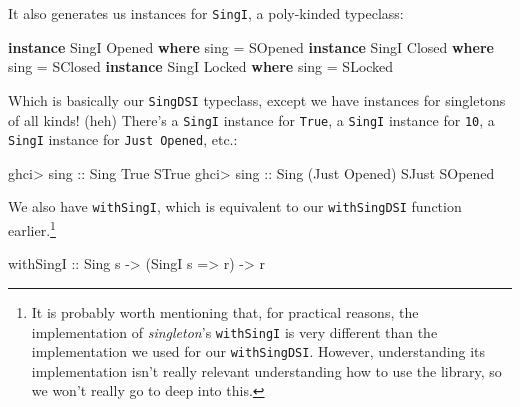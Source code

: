 \documentclass[]{article}
\newenvironment{Shaded}{}{}
\newcommand{\DataTypeTok}[1]{\textcolor[rgb]{0.56,0.13,0.00}{#1}}
\newcommand{\KeywordTok}[1]{\textcolor[rgb]{0.00,0.44,0.13}{\textbf{#1}}}
\newcommand{\NormalTok}[1]{#1}
\newcommand{\OperatorTok}[1]{\textcolor[rgb]{0.40,0.40,0.40}{#1}}
\newcommand{\OtherTok}[1]{\textcolor[rgb]{0.00,0.44,0.13}{#1}}
\begin{document}
It also generates us instances for \texttt{SingI}, a poly-kinded typeclass:

\begin{Shaded}
\begin{Highlighting}[]
\KeywordTok{instance} \DataTypeTok{SingI} \DataTypeTok{\textquotesingle{}Opened} \KeywordTok{where}
\NormalTok{    sing }\OtherTok{=} \DataTypeTok{SOpened}
\KeywordTok{instance} \DataTypeTok{SingI} \DataTypeTok{\textquotesingle{}Closed} \KeywordTok{where}
\NormalTok{    sing }\OtherTok{=} \DataTypeTok{SClosed}
\KeywordTok{instance} \DataTypeTok{SingI} \DataTypeTok{\textquotesingle{}Locked} \KeywordTok{where}
\NormalTok{    sing }\OtherTok{=} \DataTypeTok{SLocked}
\end{Highlighting}
\end{Shaded}

Which is basically our \texttt{SingDSI} typeclass, except we have instances for
singletons of all kinds! (heh) There's a \texttt{SingI} instance for
\texttt{\textquotesingle{}True}, a \texttt{SingI} instance for \texttt{10}, a
\texttt{SingI} instance for
\texttt{\textquotesingle{}Just\ \textquotesingle{}Opened}, etc.:

\begin{Shaded}
\begin{Highlighting}[]
\NormalTok{ghci}\OperatorTok{>}\OtherTok{ sing ::} \DataTypeTok{Sing} \DataTypeTok{\textquotesingle{}True}
\DataTypeTok{STrue}
\NormalTok{ghci}\OperatorTok{>}\OtherTok{ sing ::} \DataTypeTok{Sing}\NormalTok{ (}\DataTypeTok{\textquotesingle{}Just} \DataTypeTok{\textquotesingle{}Opened}\NormalTok{)}
\DataTypeTok{SJust} \DataTypeTok{SOpened}
\end{Highlighting}
\end{Shaded}

We also have \texttt{withSingI}, which is equivalent to our \texttt{withSingDSI}
function earlier.\footnote{It is probably worth mentioning that, for practical
  reasons, the implementation of \emph{singleton}'s \texttt{withSingI} is very
  different than the implementation we used for our \texttt{withSingDSI}.
  However, understanding its implementation isn't really relevant understanding
  how to use the library, so we won't really go to deep into this.}

\begin{Shaded}
\begin{Highlighting}[]
\OtherTok{withSingI ::} \DataTypeTok{Sing}\NormalTok{ s }\OtherTok{{-}>}\NormalTok{ (}\DataTypeTok{SingI}\NormalTok{ s }\OtherTok{=>}\NormalTok{ r) }\OtherTok{{-}>}\NormalTok{ r}
\end{Highlighting}
\end{Shaded}
\end{document}
